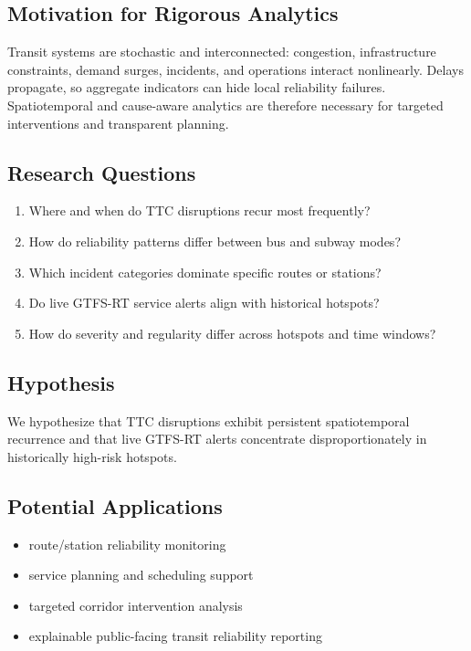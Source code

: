 \documentclass[sigconf]{acmart}
\begin{document}
\subsection{Motivation for Rigorous Analytics}
Transit systems are stochastic and interconnected: congestion, infrastructure constraints, demand surges, incidents, and operations interact nonlinearly. Delays propagate, so aggregate indicators can hide local reliability failures. Spatiotemporal and cause-aware analytics are therefore necessary for targeted interventions and transparent planning.

\subsection{Research Questions}
\begin{enumerate}
    \item Where and when do TTC disruptions recur most frequently?
    \item How do reliability patterns differ between bus and subway modes?
    \item Which incident categories dominate specific routes or stations?
    \item Do live GTFS-RT service alerts align with historical hotspots?
    \item How do severity and regularity differ across hotspots and time windows?
\end{enumerate}

\subsection{Hypothesis}
We hypothesize that TTC disruptions exhibit persistent spatiotemporal recurrence and that live GTFS-RT alerts concentrate disproportionately in historically high-risk hotspots.

\subsection{Potential Applications}
\begin{itemize}
    \item route/station reliability monitoring
    \item service planning and scheduling support
    \item targeted corridor intervention analysis
    \item explainable public-facing transit reliability reporting
\end{itemize}
\end{document}
